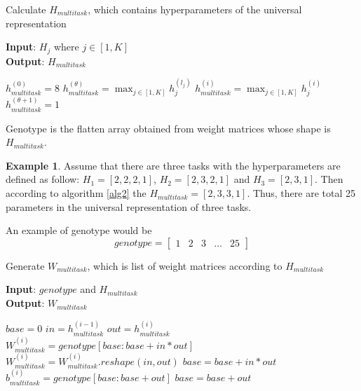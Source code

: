 \documentclass[conference]{IEEEtran}
\theoremstyle{definition}
\newtheorem{example}{Example}[section]
\begin{document}
  \begin{algorithm}
  \caption{Calculate $H_{multitask}$, which contains hyperparameters of the universal representation}
  \textbf{Input}: $H_j$ where $j \in [1, K]$\\
  \textbf{Output}: $H_{multitask}$
  \begin{algorithmic}[1]
    \State $h_{multitask}^{(0)} = 8$
    \State $h_{multitask}^{(\theta)} = \max_{j \in [1, K]} h_j^{(l_j)}$
      \State $h_{multitask}^{(i)} = \max_{j \in [1, K]}{h_j^{(i)}}$
    \EndFor
    \State $h_{multitask}^{(\theta + 1)} = 1$
  \end{algorithmic}
  \label{alg2}
  \end{algorithm}

  Genotype is the flatten array obtained from weight matrices whose shape is $H_{multitask}$.
  \begin{example}
    Assume that there are three tasks with the hyperparameters are defined as follow: $H_1 = [2, 2, 2, 1]$, $H_2 = [2, 3, 2, 1]$ and $H_3 = [2, 3, 1]$.
    Then according to algorithm \ref{alg2} the $H_{multitask}=[2, 3, 3, 1]$. Thus, there are total 25 parameters in the universal representation of three tasks.

    An example of genotype would be 
    \begin{equation}
      genotype=
      \begin{bmatrix}
        1& 2& 3& \dots & 25
      \end{bmatrix}
    \end{equation}
    \label{ex1}
  \end{example}

  \begin{algorithm}
  \caption{Generate $W_{multitask}$, which is list of weight matrices according to $H_{multitask}$}
  \textbf{Input}: $genotype$ and $H_{multitask}$\\
  \textbf{Output}: $W_{multitask}$
  \begin{algorithmic}[1]
    \State $base = 0$
      \State $in = h_{multitask}^{(i-1)}$
      \State $out = h_{multitask}^{(i)}$
      \State $W_{multitask}^{(i)} = genotype[base: base + in * out]$
      \State $W_{multitask}^{(i)} = W_{multitask}^{(i)}.reshape(in, out)$
      \State $base = base + in * out$
      \State $b_{multitask}^{(i)} = genotype[base: base + out]$
      \State $base = base + out$
    \EndFor
  \end{algorithmic}
  \label{alg3}
  \end{algorithm}
\end{document}
